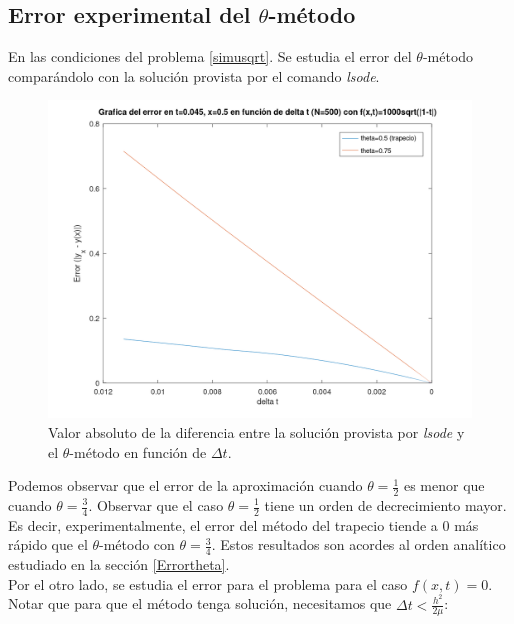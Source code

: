 \documentclass{endm}
\begin{document}
\subsection{Error experimental del $\theta$-método}
En las condiciones del problema \ref{simusqrt}. Se estudia el error del  $\theta$-método comparándolo con la solución provista por el comando \textit{lsode}.
\begin{figure}[H]
    \centering
    \includegraphics[scale=0.4]{errort50t75.png}
    \caption{Valor absoluto de la diferencia entre la solución provista por \textit{lsode} y el $\theta$-método en función de $\Delta t$.}
    \label{fig:snipf0}
\end{figure}
Podemos observar que el error de la aproximación cuando $\theta=\frac{1}{2}$ es menor que cuando $\theta=\frac{3}{4}$. Observar que el caso $\theta=\frac{1}{2}$ tiene un orden de decrecimiento mayor. Es decir, experimentalmente, el error del método del trapecio tiende a $0$ más rápido que el $\theta$-método con $\theta=\frac{3}{4}$. Estos resultados son acordes al orden analítico estudiado en la sección \ref{Errortheta}.\\
Por el otro lado, se estudia el error para el problema para el caso $f(x,t)=0$. Notar que para que el método tenga solución, necesitamos que $\Delta t < \frac{h^2}{2\mu}$:
\end{document}
